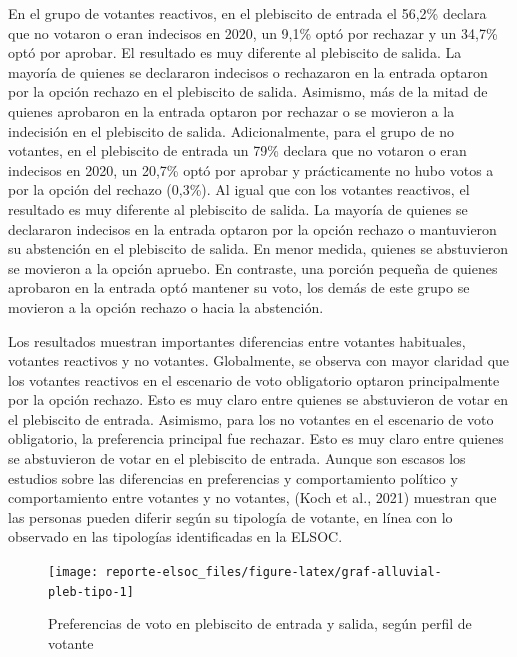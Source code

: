 \documentclass[
  12pt,
]{book}
\begin{document}
En el grupo de votantes reactivos, en el plebiscito de entrada el 56,2\% declara que no votaron o eran indecisos en 2020, un 9,1\% optó por rechazar y un 34,7\% optó por aprobar. El resultado es muy diferente al plebiscito de salida. La mayoría de quienes se declararon indecisos o rechazaron en la entrada optaron por la opción rechazo en el plebiscito de salida. Asimismo, más de la mitad de quienes aprobaron en la entrada optaron por rechazar o se movieron a la indecisión en el plebiscito de salida. Adicionalmente, para el grupo de no votantes, en el plebiscito de entrada un 79\% declara que no votaron o eran indecisos en 2020, un 20,7\% optó por aprobar y prácticamente no hubo votos a por la opción del rechazo (0,3\%). Al igual que con los votantes reactivos, el resultado es muy diferente al plebiscito de salida. La mayoría de quienes se declararon indecisos en la entrada optaron por la opción rechazo o mantuvieron su abstención en el plebiscito de salida. En menor medida, quienes se abstuvieron se movieron a la opción apruebo. En contraste, una porción pequeña de quienes aprobaron en la entrada optó mantener su voto, los demás de este grupo se movieron a la opción rechazo o hacia la abstención.

Los resultados muestran importantes diferencias entre votantes habituales, votantes reactivos y no votantes. Globalmente, se observa con mayor claridad que los votantes reactivos en el escenario de voto obligatorio optaron principalmente por la opción rechazo. Esto es muy claro entre quienes se abstuvieron de votar en el plebiscito de entrada. Asimismo, para los no votantes en el escenario de voto obligatorio, la preferencia principal fue rechazar. Esto es muy claro entre quienes se abstuvieron de votar en el plebiscito de entrada. Aunque son escasos los estudios sobre las diferencias en preferencias y comportamiento político y comportamiento entre votantes y no votantes, (Koch et al., 2021) muestran que las personas pueden diferir según su tipología de votante, en línea con lo observado en las tipologías identificadas en la ELSOC.

\begin{figure}

{\centering \texttt{[image: reporte-elsoc\_files/figure-latex/graf-alluvial-pleb-tipo-1]} 

}

\caption{Preferencias de voto en plebiscito de entrada y salida, según perfil de votante}\label{fig:graf-alluvial-pleb-tipo}
\end{figure}
\end{document}
